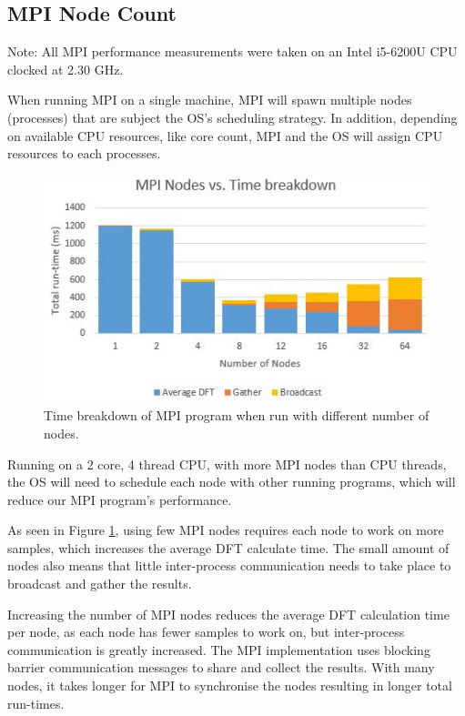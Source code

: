 \documentclass[11pt,a4paper]{article}
\begin{document}
\subsection{MPI Node Count}
Note: All MPI performance measurements were taken on an Intel i5-6200U CPU clocked at 2.30 GHz.

When running MPI on a single machine, MPI will spawn multiple nodes (processes) that are subject the OS's scheduling strategy. In addition, depending on available CPU resources, like core count, MPI and the OS will assign CPU resources to each processes.

\begin{figure}
\begin{center}
\includegraphics[scale=0.7]{mpi_eval_nodes}
\end{center}
\caption{Time breakdown of MPI program when run with different number of nodes.}
\label{fig:mpi_eval_nodes}
\end{figure}

Running on a 2 core, 4 thread CPU, with more MPI nodes than CPU threads, the OS will need to schedule each node with other running programs, which will reduce our MPI program's performance.

As seen in Figure \ref{fig:mpi_eval_nodes}, using few MPI nodes requires each node to work on more samples, which increases the average DFT calculate time. The small amount of nodes also means that little inter-process communication needs to take place to broadcast and gather the results.

Increasing the number of MPI nodes reduces the average DFT calculation time per node, as each node has fewer samples to work on, but inter-process communication is greatly increased. The MPI implementation uses blocking barrier communication messages to share and collect the results. With many nodes, it takes longer for MPI to synchronise the nodes resulting in longer total run-times.
\end{document}
